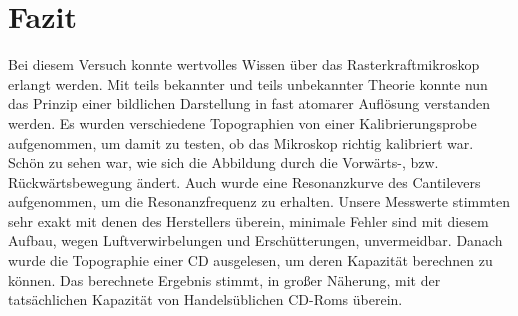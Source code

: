 \chapter{Fazit}

Bei diesem Versuch konnte wertvolles Wissen über das Rasterkraftmikroskop erlangt werden.
Mit teils bekannter und teils unbekannter Theorie konnte nun das Prinzip einer bildlichen Darstellung in fast atomarer Auflösung verstanden werden.
Es wurden verschiedene Topographien von einer Kalibrierungsprobe aufgenommen, um damit zu testen, ob das Mikroskop richtig kalibriert war.
Schön zu sehen war, wie sich die Abbildung durch die Vorwärts-, bzw. Rückwärtsbewegung ändert.
Auch wurde eine Resonanzkurve des Cantilevers aufgenommen, um die Resonanzfrequenz zu erhalten.
Unsere Messwerte stimmten sehr exakt mit denen des Herstellers überein, minimale Fehler sind mit diesem Aufbau, wegen Luftverwirbelungen und Erschütterungen, unvermeidbar.
Danach wurde die Topographie einer CD ausgelesen, um deren Kapazität berechnen zu können.
Das berechnete Ergebnis stimmt, in großer Näherung, mit der tatsächlichen Kapazität von Handelsüblichen CD-Roms überein.
